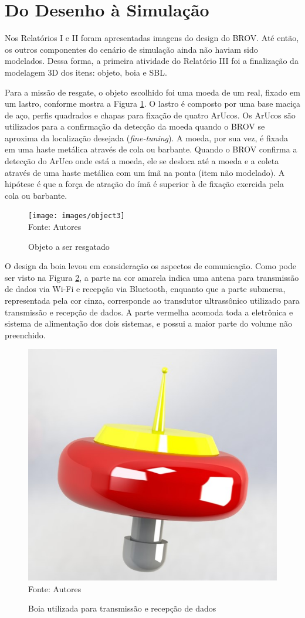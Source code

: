 \section{Do Desenho à Simulação}

Nos Relatórios I e II foram apresentadas imagens do design do BROV. Até então, os outros componentes do cenário de simulação ainda não haviam sido modelados. Dessa forma, a primeira atividade do Relatório III foi a finalização da modelagem 3D dos itens: objeto, boia e SBL. 

Para a missão de resgate, o objeto escolhido foi uma moeda de um real, fixado em um lastro, conforme mostra a Figura \ref{fig:object3}. O lastro é composto por uma base maciça de aço, perfis quadrados e chapas para fixação de quatro ArUcos. Os ArUcos são utilizados para a confirmação da detecção da moeda quando o BROV se aproxima da localização desejada (\textit{fine-tuning}). A moeda, por sua vez, é fixada em uma haste metálica através de cola ou barbante. Quando o BROV confirma a detecção do ArUco onde está a moeda, ele se desloca até a moeda e a coleta através de uma haste metálica com um ímã na ponta (item não modelado). A hipótese é que a força de atração do ímã é superior à de fixação exercida pela cola ou barbante.

\begin{figure}[h]
	\centering
	\caption[Objeto a ser resgatado]{Objeto a ser resgatado}
	\label{fig:object3}
	\texttt{[image: images/object3]}\\
	\footnotesize Fonte: Autores
\end{figure}

O design da boia levou em consideração os aspectos de comunicação. Como pode ser visto na Figura \ref{fig:boia}, a parte na cor amarela indica uma antena para transmissão de dados via Wi-Fi e recepção via Bluetooth, enquanto que a parte submersa, representada pela cor cinza, corresponde ao transdutor ultrassônico utilizado para transmissão e recepção de dados. A parte vermelha acomoda toda a eletrônica e sistema de alimentação dos dois sistemas, e possui a maior parte do volume não preenchido.

\begin{figure}[h]
	\centering
	\caption[Boia utilizada para transmissão e recepção de dados]{Boia utilizada para transmissão e recepção de dados}
	\label{fig:boia}
	\includegraphics[width=0.6\linewidth]{images/boia}\\
	\footnotesize Fonte: Autores
\end{figure}

